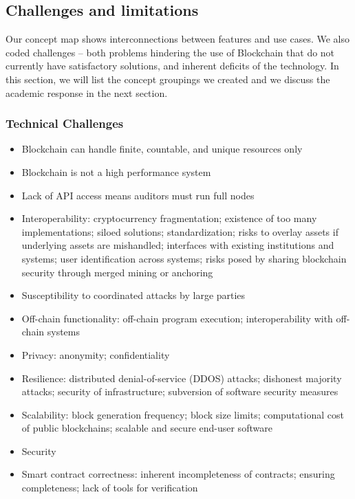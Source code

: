 {\subsection{Challenges and limitations}
\label{subsec:challenges}


Our concept map shows interconnections between features and use cases. We also coded challenges -- both problems hindering the use of Blockchain that do not currently have satisfactory solutions, and inherent deficits of the technology. In this section, we will list the concept groupings we created and we discuss the academic response in the next section.
\subsubsection{Technical Challenges}
\begin{itemize}
	\item{Blockchain can handle finite, countable, and unique resources only}
	\item{Blockchain is not a high performance system}
	\item{Lack of API access means auditors must run full nodes}
	\item{Interoperability: cryptocurrency fragmentation; existence of too many implementations; siloed solutions; standardization; risks to overlay assets if underlying assets are mishandled; interfaces with existing institutions and systems; user identification across systems; risks posed by sharing blockchain security through merged mining or anchoring}	
        \item{Susceptibility to coordinated attacks by large parties}
	\item{Off-chain functionality: off-chain program execution; interoperability with off-chain systems}
	\item{Privacy: anonymity; confidentiality}
	\item{Resilience: distributed denial-of-service (DDOS) attacks; dishonest majority attacks; security of infrastructure; subversion of software security measures}		
	\item{Scalability: block generation frequency; block size limits; computational cost of public blockchains; scalable and secure end-user software}
	\item{Security}
	\item{Smart contract correctness: inherent incompleteness of contracts; ensuring completeness; lack of tools for verification}
\end{itemize}

}
